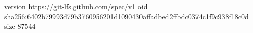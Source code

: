 version https://git-lfs.github.com/spec/v1
oid sha256:6402b79993d79b3760956201d1090430affadbed2ffbdc0374c1f9c938f18c0d
size 87544
